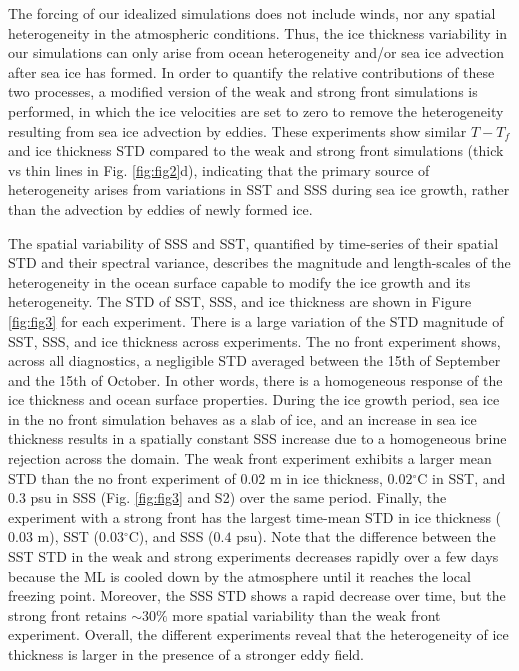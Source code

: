 \documentclass[draft]{agujournal2019}
\begin{document}
The forcing of our idealized simulations does not include winds, nor any spatial heterogeneity in the atmospheric conditions.
Thus, the ice thickness variability in our simulations can only arise from ocean heterogeneity and/or sea ice advection after sea ice has formed. In order to quantify the relative contributions of these two processes, a modified version of the weak and strong front simulations is performed, in which the ice velocities are set to zero to remove the heterogeneity resulting from sea ice advection by eddies. These experiments show similar $T-T_f$ and ice thickness STD compared to the weak and strong front simulations (thick vs thin lines in Fig. \ref{fig:fig2}d), indicating that the primary source of heterogeneity arises from variations in SST and SSS during sea ice growth, rather than the advection by eddies of newly formed ice.

The spatial variability of SSS and SST, quantified by time-series of their spatial STD and their spectral variance, describes the magnitude and length-scales of the heterogeneity in the ocean surface capable to modify the ice growth and its heterogeneity. The STD of SST, SSS, and ice thickness are shown in Figure \ref{fig:fig3} for each experiment. 
There is a large variation of the STD magnitude of SST, SSS, and ice thickness across experiments. The no front experiment shows, across all diagnostics, a negligible STD averaged between the 15th of September and the 15th of October. In other words, there is a homogeneous response of the ice thickness and ocean surface properties. During the ice growth period, sea ice in the no front simulation behaves as a slab of ice, and an increase in sea ice thickness results in a spatially constant SSS increase due to a homogeneous brine rejection across the domain.
The weak front experiment exhibits a larger mean STD than the no front experiment of $0.02$ m in ice thickness, $0.02\mathrm{^{\circ}C}$ in SST, and $0.3$ psu in SSS (Fig. \ref{fig:fig3} and S2) over the same period.
Finally, the experiment with a strong front has the largest time-mean STD in ice thickness ($0.03$ m), SST ($0.03\mathrm{^{\circ}C}$), and SSS ($0.4$ psu). Note that the difference between the SST STD in the weak and strong experiments decreases rapidly over a few days because the ML is cooled down by the atmosphere until it reaches the local freezing point. Moreover, the SSS STD shows a rapid decrease over time, but the strong front retains $\sim 30\%$ more spatial variability than the weak front experiment. Overall, the different experiments reveal that the heterogeneity of ice thickness is larger in the presence of a stronger eddy field. 
\end{document}
